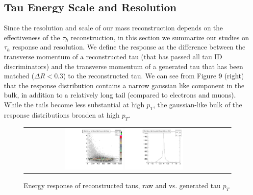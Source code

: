 \subsection{Tau Energy Scale and Resolution}

Since the resolution and scale of our mass reconstruction depends on the effectiveness of the $\tau_{h}$ reconstruction, in this section we summarize our studies on $\tau_{h}$ response and resolution. We define the response as the difference between the transverse momentum of a reconstructed tau (that has passed all tau ID discriminators) and the transverse momentum of a generated tau that has been matched ($\Delta R < 0.3$) to the reconstructed tau. We can see from Figure 9 (right) that the response distribution contains a narrow gaussian like component in the bulk, in addition to a relatively long tail (compared to electrons and muons). While the tails become less substantial at high $p_{T}$, the gaussian-like bulk of the response distributions broaden at high $p_{T}$.
 
\begin{figure}[tbh!]
  \centering
  \begin{tabular}{cc}
  \includegraphics[width=0.30\textwidth]{Tau2dResolution_4_29_16.pdf}
  \includegraphics[width=0.30\textwidth]{TauResolution_500to750_4_29_16.pdf}
  \end{tabular}
  \caption{Energy response of reconstructed taus, raw and vs. generated tau $p_{T}$}
  \label{fig:Tau2dResolution}
\end{figure}


